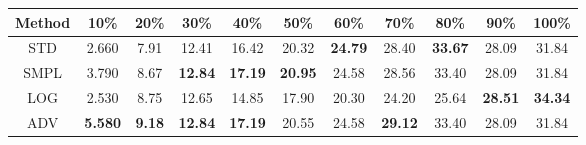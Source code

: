 \documentclass{standalone}
\begin{document}
\begin{tabular}{c|cccccccccc}
      \toprule
      Method & 10\% & 20\% & 30\% & 40\% & 50\% & 60\% & 70\% & 80\% & 90\% & 100\% \\
      \midrule
STD & 2.660 & 7.91 & 12.41 & 16.42 & 20.32 & \textbf{24.79} & 28.40 & \textbf{33.67} & 28.09 & 31.84\\
SMPL & 3.790 & 8.67 & \textbf{12.84} & \textbf{17.19} & \textbf{20.95} & 24.58 & 28.56 & 33.40 & 28.09 & 31.84\\
LOG & 2.530 & 8.75 & 12.65 & 14.85 & 17.90 & 20.30 & 24.20 & 25.64 & \textbf{28.51} & \textbf{34.34}\\
ADV & \textbf{5.580} & \textbf{9.18} & \textbf{12.84} & \textbf{17.19} & 20.55 & 24.58 & \textbf{29.12} & 33.40 & 28.09 & 31.84\\
  \bottomrule
\end{tabular}
\end{document}
